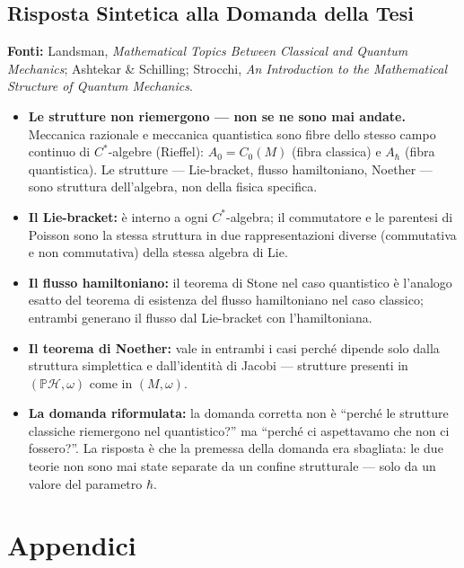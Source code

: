 \documentclass[12pt, a4paper]{article}
\newcommand{\fonti}[1]{%
	\begin{fontebox}
		\textcolor{fontecolor}{\footnotesize\textbf{Fonti:} #1}
	\end{fontebox}%
}
\begin{document}
	\subsection{Risposta Sintetica alla Domanda della Tesi}
	
	\fonti{Landsman, \textit{Mathematical Topics Between Classical and Quantum Mechanics};
		Ashtekar \& Schilling; Strocchi, \textit{An Introduction to the Mathematical
			Structure of Quantum Mechanics}.}
	
	\begin{itemize}
		\item \textbf{Le strutture non riemergono --- non se ne sono mai andate.}
		Meccanica razionale e meccanica quantistica sono fibre dello stesso campo continuo
		di $C^*$-algebre (Rieffel): $A_0 = C_0(M)$ (fibra classica) e $A_\hbar$
		(fibra quantistica). Le strutture --- Lie-bracket, flusso hamiltoniano, Noether
		--- sono struttura dell'algebra, non della fisica specifica.
		\item \textbf{Il Lie-bracket:} è interno a ogni $C^*$-algebra; il commutatore
		e le parentesi di Poisson sono la stessa struttura in due rappresentazioni diverse
		(commutativa e non commutativa) della stessa algebra di Lie.
		\item \textbf{Il flusso hamiltoniano:} il teorema di Stone nel caso quantistico
		è l'analogo esatto del teorema di esistenza del flusso hamiltoniano nel caso
		classico; entrambi generano il flusso dal Lie-bracket con l'hamiltoniana.
		\item \textbf{Il teorema di Noether:} vale in entrambi i casi perché dipende
		solo dalla struttura simplettica e dall'identità di Jacobi --- strutture presenti
		in $(\mathbb{P}\mathcal{H}, \omega)$ come in $(M, \omega)$.
		\item \textbf{La domanda riformulata:} la domanda corretta non è ``perché le
		strutture classiche riemergono nel quantistico?'' ma ``perché ci aspettavamo
		che non ci fossero?''. La risposta è che la premessa della domanda era sbagliata:
		le due teorie non sono mai state separate da un confine strutturale ---
		solo da un valore del parametro $\hbar$.
	\end{itemize}
	
	\newpage
	\section*{Appendici}
	
\end{document}

